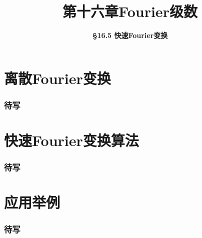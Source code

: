 \everymath{\displaystyle}



\title[第十六章\\
Fourier级数]{\texorpdfstring{\LARGE \bfseries 第十六章\quad Fourier级数}{第十六章 Fourier级数}} %
\author[\smaller \S 16.5\\
快速Fourier变换] %
{\Large \bfseries \S 16.5 快速Fourier变换}
\date{}





\begin{frame}

\titlepage %

\end{frame}



\section{离散Fourier变换}


\begin{frame}
\frametitle{待写}

\end{frame}


\section{快速Fourier变换算法}


\begin{frame}
\frametitle{待写}

\end{frame}


\section{应用举例}


\begin{frame}
\frametitle{待写}

\end{frame}



